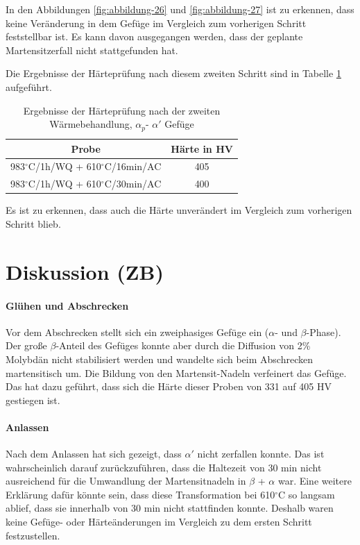 In den Abbildungen \ref{fig:abbildung-26} und \ref{fig:abbildung-27} ist zu erkennen, dass keine Veränderung in dem Gefüge im Vergleich zum vorherigen Schritt feststellbar ist. Es kann davon ausgegangen werden, dass der geplante Martensitzerfall nicht stattgefunden hat.

Die Ergebnisse der Härteprüfung nach diesem zweiten Schritt sind in Tabelle \ref{Tabelle 9} aufgeführt.

\begin{table}[h]
	\centering
	\begin{tabular}{|c|c|}
		\hline 
		Probe & Härte in HV \\ 
		\hline 
		983$^\circ$C/1h/WQ + 610$^\circ$C/16min/AC & 405 \\ 
		\hline 
		983$^\circ$C/1h/WQ + 610$^\circ$C/30min/AC & 400 \\ 
		\hline 
	\end{tabular} 
	\caption{Ergebnisse der Härteprüfung nach der zweiten Wärmebehandlung, $\alpha_p$- $\alpha'$ Gefüge}
	\label{Tabelle 9}
\end{table}

Es ist zu erkennen, dass auch die Härte unverändert im Vergleich zum vorherigen Schritt blieb.

\section{Diskussion (ZB)}

\paragraph{Glühen und Abschrecken}
Vor dem Abschrecken stellt sich ein zweiphasiges Gefüge ein ($\alpha$- und $\beta$-Phase). Der große $\beta$-Anteil des Gefüges konnte aber durch die Diffusion von 2\% Molybdän nicht stabilisiert werden und wandelte sich beim Abschrecken martensitisch um. Die Bildung von den Martensit-Nadeln verfeinert das Gefüge. Das hat dazu geführt, dass sich die Härte dieser Proben von 331 auf 405 HV gestiegen ist. 

\paragraph{Anlassen} Nach dem Anlassen hat sich gezeigt, dass $\alpha'$ nicht zerfallen konnte. Das ist wahrscheinlich darauf zurückzuführen, dass die Haltezeit von 30 min nicht ausreichend für die Umwandlung der Martensitnadeln in  $\beta$ + $\alpha$ war. Eine weitere Erklärung dafür könnte sein, dass diese Transformation bei 610$^\circ$C so langsam ablief, dass sie innerhalb von 30 min nicht stattfinden konnte.
Deshalb waren keine Gefüge- oder Härteänderungen im Vergleich zu dem ersten Schritt festzustellen. 

